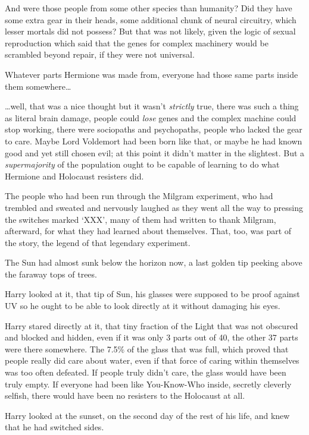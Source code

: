 And were those people from some other species than humanity? Did they have some 
extra gear in their heads, some additional chunk of neural circuitry, which 
lesser mortals did not possess? But that was not likely, given the logic of 
sexual reproduction which said that the genes for complex machinery would be 
scrambled beyond repair, if they were not universal.

Whatever parts Hermione was made from, everyone had those same parts inside 
them somewhere{\ldots}

{\ldots}well, that was a nice thought but it wasn't \emph{strictly} true, there 
was such a thing as literal brain damage, people could \emph{lose} genes and 
the complex machine could stop working, there were sociopaths and psychopaths, 
people who lacked the gear to care. Maybe Lord Voldemort had been born like 
that, or maybe he had known good and yet still chosen evil; at this point it 
didn't matter in the slightest. But a \emph{supermajority} of the population 
ought to be capable of learning to do what Hermione and Holocaust resisters did.

The people who had been run through the Milgram experiment, who had trembled 
and sweated and nervously laughed as they went all the way to pressing the 
switches marked `XXX', many of them had written to thank Milgram, afterward, 
for what they had learned about themselves. That, too, was part of the story, 
the legend of that legendary experiment.

The Sun had almost sunk below the horizon now, a last golden tip peeking above 
the faraway tops of trees.

Harry looked at it, that tip of Sun, his glasses were supposed to be proof 
against UV so he ought to be able to look directly at it without damaging his 
eyes.

Harry stared directly at it, that tiny fraction of the Light that was not 
obscured and blocked and hidden, even if it was only 3 parts out of 40, the 
other 37 parts were there somewhere. The 7.5\% of the glass that was full, which 
proved that people really did care about water, even if that force of caring 
within themselves was too often defeated. If people truly didn't care, the 
glass would have been truly empty. If everyone had been like You-Know-Who 
inside, secretly cleverly selfish, there would have been no resisters to the 
Holocaust at all.

Harry looked at the sunset, on the second day of the rest of his life, and knew 
that he had switched sides.

